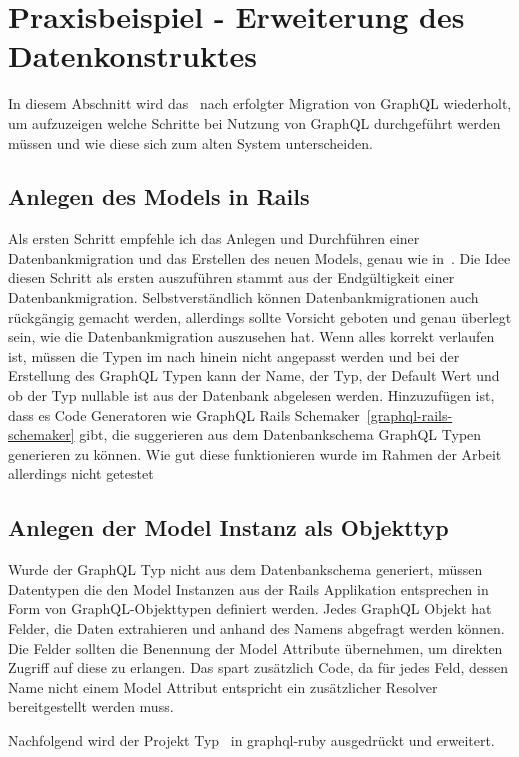 \section{Praxisbeispiel - Erweiterung des Datenkonstruktes}
In diesem Abschnitt wird das~ nach erfolgter Migration von GraphQL wiederholt, um aufzuzeigen welche Schritte bei Nutzung von GraphQL durchgeführt werden müssen und wie diese sich zum alten System unterscheiden.

\subsection{Anlegen des Models in Rails}
Als ersten Schritt empfehle ich das Anlegen und Durchführen einer Datenbankmigration und das Erstellen des neuen Models, genau wie in~. Die Idee diesen Schritt als ersten auszuführen stammt aus der Endgültigkeit einer Datenbankmigration. Selbstverständlich können Datenbankmigrationen auch rückgängig gemacht werden, allerdings sollte Vorsicht geboten und genau überlegt sein, wie die Datenbankmigration auszusehen hat. Wenn alles korrekt verlaufen ist, müssen die Typen im nach hinein nicht angepasst werden und bei der Erstellung des GraphQL Typen kann der Name, der Typ, der Default Wert und ob der Typ nullable ist aus der Datenbank abgelesen werden. Hinzuzufügen ist, dass es Code Generatoren wie GraphQL Rails Schemaker~\ref{graphql-rails-schemaker} gibt, die suggerieren aus dem Datenbankschema GraphQL Typen generieren zu können. Wie gut diese funktionieren wurde im Rahmen der Arbeit allerdings nicht getestet

\subsection{Anlegen der Model Instanz als Objekttyp}
\label{graphql:objecttype}
Wurde der GraphQL Typ nicht aus dem Datenbankschema generiert, müssen Datentypen die den Model Instanzen aus der Rails Applikation entsprechen in Form von GraphQL-Objekttypen definiert werden. 
Jedes GraphQL Objekt hat Felder, die Daten extrahieren und anhand des Namens abgefragt werden können. 
Die Felder sollten die Benennung der Model Attribute übernehmen, um direkten Zugriff auf diese zu erlangen. Das spart zusätzlich Code, da für jedes Feld, dessen Name nicht einem Model Attribut entspricht ein zusätzlicher Resolver bereitgestellt werden muss.

Nachfolgend wird der Projekt Typ~ in graphql-ruby ausgedrückt und erweitert.

